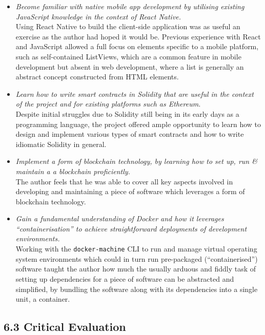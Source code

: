 \documentclass[12pt]{report}
\begin{document}
\begin{itemize}
\item
  \emph{Become familiar with native mobile app development by utilising
  existing JavaScript knowledge in the context of React Native.}\\
  Using React Native to build the client-side application was as useful
  an exercise as the author had hoped it would be. Previous experience
  with React and JavaScript allowed a full focus on elements specific to
  a mobile platform, such as self-contained ListViews, which are a
  common feature in mobile development but absent in web development,
  where a list is generally an abstract concept constructed from HTML
  elements.
\item
  \emph{Learn how to write smart contracts in Solidity that are useful
  in the context of the project and for existing platforms such as
  Ethereum.}\\
  Despite initial struggles due to Solidity still being in its early
  days as a programming language, the project offered ample opportunity
  to learn how to design and implement various types of smart contracts
  and how to write idiomatic Solidity in general.
\item
  \emph{Implement a form of blockchain technology, by learning how to
  set up, run \& maintain a a blockchain proficiently.}\\
  The author feels that he was able to cover all key aspects involved in
  developing and maintaining a piece of software which leverages a form
  of blockchain technology.
\item
  \emph{Gain a fundamental understanding of Docker and how it leverages
  ``containerisation'' to achieve straightforward deployments of
  development environments.}\\
  Working with the \texttt{docker-machine} CLI to run and manage virtual
  operating system environments which could in turn run pre-packaged
  (``containerised'') software taught the author how much the usually
  arduous and fiddly task of setting up dependencies for a piece of
  software can be abstracted and simplified, by bundling the software
  along with its dependencies into a single unit, a container.
\end{itemize}

\subsection{6.3 Critical Evaluation}\label{critical-evaluation}
\end{document}
